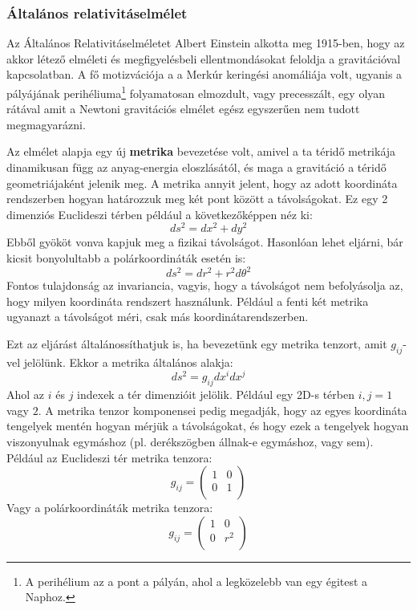 \documentclass[../main.tex]{subfiles}
\begin{document}
\subsubsection{Általános relativitáselmélet}
Az Általános Relativitáselméletet Albert Einstein alkotta meg 1915-ben, hogy az akkor létező elméleti és megfigyelésbeli ellentmondásokat feloldja a gravitációval kapcsolatban. A fő motizvációja a
a Merkúr keringési anomáliája volt, ugyanis a pályájának perihéliuma\footnote{
    A perihélium az a pont a pályán, ahol a legközelebb van egy égitest a Naphoz.
}
folyamatosan elmozdult, vagy precesszált, egy olyan rátával amit a Newtoni gravitációs elmélet egész egyszerűen nem tudott megmagyarázni. 

Az elmélet alapja egy új \textbf{metrika} bevezetése volt, amivel a ta téridő metrikája dinamikusan függ az anyag-energia eloszlásától, és maga a gravitáció a téridő geometriájaként jelenik meg.
A metrika annyit jelent, hogy az adott koordináta rendszerben hogyan határozzuk meg két pont között a távolságokat. Ez egy 2 dimenziós Euclideszi térben például a következőképpen néz ki:
\begin{equation}
    ds^2 = dx^2 + dy^2
\end{equation}
Ebből gyököt vonva kapjuk meg a fizikai távolságot. Hasonlóan lehet eljárni, bár kicsit bonyolultabb a polárkoordináták esetén is:
\begin{equation}
    ds^2 = dr^2 + r^2 d\theta^2
\end{equation}
Fontos tulajdonság az invariancia, vagyis, hogy a távolságot nem befolyásolja az, hogy milyen koordináta rendszert használunk. Például a fenti két metrika ugyanazt a távolságot méri, csak más koordinátarendszerben.

Ezt az eljárást általánossíthatjuk is, ha bevezetünk egy metrika tenzort, amit $g_{ij}$-vel jelölünk. Ekkor a metrika általános alakja:
\begin{equation}
    ds^2 = g_{ij} dx^i dx^j
\end{equation}
Ahol az $i$ és $j$ indexek a tér dimenzióit jelölik. Például egy 2D-s térben $i, j = 1$ vagy $2$. A metrika tenzor komponensei pedig megadják, hogy az egyes koordináta tengelyek mentén hogyan mérjük a távolságokat, és hogy ezek a tengelyek
hogyan viszonyulnak egymáshoz (pl. derékszögben állnak-e egymáshoz, vagy sem). Például az Euclideszi tér metrika tenzora:
\begin{equation}
    g_{ij} = \begin{pmatrix}
        1 & 0 \\
        0 & 1 \\
    \end{pmatrix}
\end{equation}
Vagy a polárkoordináták metrika tenzora:
\begin{equation}
    g_{ij} = \begin{pmatrix}
        1 & 0 \\
        0 & r^2 \\
    \end{pmatrix}
\end{equation}
\end{document}
